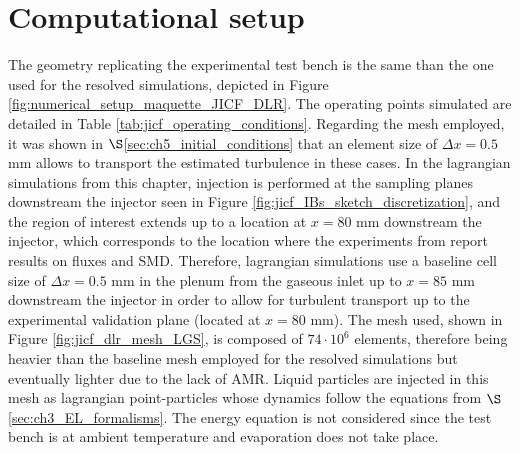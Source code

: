\section{Computational setup}

The geometry replicating the experimental test bench is the same than the one used for the resolved simulations, depicted in Figure \ref{fig:numerical_setup_maquette_JICF_DLR}. The operating points simulated are detailed in Table \ref{tab:jicf_operating_conditions}. Regarding the mesh employed, it was shown in $\S$\ref{sec:ch5_initial_conditions} that an element size of $\Delta x = 0.5$ mm allows to transport the estimated turbulence in these cases. In the lagrangian simulations from this chapter, injection is performed at the sampling planes downstream the injector seen in Figure \ref{fig:jicf_IBs_sketch_discretization}, and the region of interest extends up to a location at $x = 80$ mm downstream the injector, which corresponds to the location where the experiments from  report results on fluxes and SMD. Therefore, lagrangian simulations use a baseline cell size of $\Delta x = 0.5$ mm in the plenum from the gaseous inlet up to $x = 85$ mm downstream the injector in order to allow for turbulent transport up to the experimental validation plane (located at $x = 80$ mm). The mesh used, shown in Figure \ref{fig:jicf_dlr_mesh_LGS}, is composed of $74 \cdot 10^6$ elements, therefore being heavier than the baseline mesh employed for the resolved simulations but eventually lighter due to the lack of AMR. Liquid particles are injected in this mesh as lagrangian point-particles whose dynamics follow the equations from  $\S$\ref{sec:ch3_EL_formalisms}. The energy equation is not considered since the test bench is at ambient temperature and evaporation does not take place.


